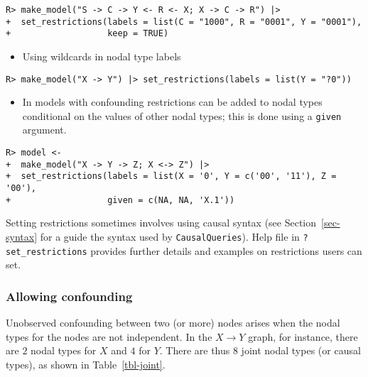 \documentclass[
  11pt,
  article]{jss}
\providecommand{\tightlist}{%
  \setlength{\itemsep}{0pt}\setlength{\parskip}{0pt}}\usepackage{longtable,booktabs,array}
\begin{document}
\begin{verbatim}
R> make_model("S -> C -> Y <- R <- X; X -> C -> R") |>
+  set_restrictions(labels = list(C = "1000", R = "0001", Y = "0001"), 
+                   keep = TRUE)
\end{verbatim}

\begin{itemize}
\tightlist
\item
  Using wildcards in nodal type labels
\end{itemize}

\begin{verbatim}
R> make_model("X -> Y") |> set_restrictions(labels = list(Y = "?0"))
\end{verbatim}

\begin{itemize}
\tightlist
\item
  In models with confounding restrictions can be added to nodal types
  conditional on the values of other nodal types; this is done using a
  \texttt{given} argument.
\end{itemize}

\begin{verbatim}
R> model <- 
+  make_model("X -> Y -> Z; X <-> Z") |>
+  set_restrictions(labels = list(X = '0', Y = c('00', '11'), Z = '00'), 
+                   given = c(NA, NA, 'X.1'))
\end{verbatim}

Setting restrictions sometimes involves using causal syntax (see
Section~\ref{sec-syntax} for a guide the syntax used by
\texttt{CausalQueries}). Help file in \texttt{?set\_restrictions}
provides further details and examples on restrictions users can set.

\hypertarget{sec-confounding}{%
\subsubsection{Allowing confounding}\label{sec-confounding}}

Unobserved confounding between two (or more) nodes arises when the nodal
types for the nodes are not independent. In the \(X \rightarrow Y\)
graph, for instance, there are \(2\) nodal types for \(X\) and \(4\) for
\(Y\). There are thus 8 joint nodal types (or causal types), as shown in
Table~\ref{tbl-joint}.
\end{document}

